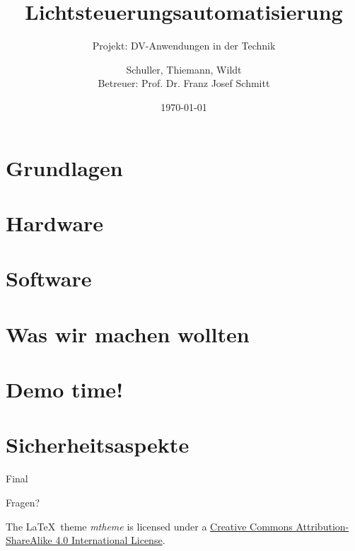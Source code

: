 \documentclass[10pt, compress]{beamer}
\title{Lichtsteuerungsautomatisierung}
\subtitle{Projekt: DV-Anwendungen in der Technik}
\date{\today}
\author{Schuller, Thiemann, Wildt\\
  Betreuer: Prof. Dr. Franz Josef Schmitt}
\institute{Hochschule Rosenheim}
\begin{document}
\maketitle

\section{Grundlagen}



\section{Hardware}



\section{Software}



\section{Was wir machen wollten}



\section{Demo time!}



\section{Sicherheitsaspekte}



\begin{frame}{Final}

  \begin{center}\huge Fragen?\end{center}
    
  \vspace{1cm}
  \begin{center}
  {\small

  The \LaTeX \ theme \emph{mtheme} is licensed under a
  \href{http://creativecommons.org/licenses/by-sa/4.0/}{Creative Commons
  Attribution-ShareAlike 4.0 International License}.}

  \ccbysa
  
  \end{center}

\end{frame}
\end{document}
